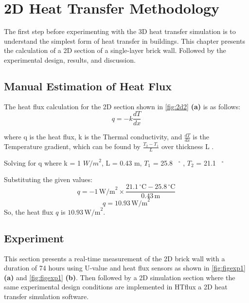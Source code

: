 
\chapter{2D Heat Transfer Methodology}
The first step before experimenting with the 3D heat transfer simulation is to understand the simplest form of heat transfer in buildings. This chapter presents the calculation of a 2D section of a single-layer brick wall. Followed by the experimental design, results, and discussion.

\section{Manual Estimation of Heat Flux}
The heat flux calculation for the 2D section shown in \ref{fig:2d2} \textbf{(a)} is as follows:
\begin{equation}
q = -k \frac{dT}{dx}
\end{equation}

where q is the heat flux,
k is the Thermal conductivity, and
$\frac{dT}{dx}$ is the Temperature gradient, which can be found by $\frac{T_2 - T_1}{L}$ over thickness L \cite{heattransfund}. 

Solving for q where k = 1 ${W/m}^2$, 
L = 0.43 m,
$T_1$ = 25.8 \, $^\circ$ , 
$T_2$  = 21.1 \, $^\circ$ 



Substituting the given values:
\[ q = -1 \, \text{W/m}^2 \times \frac{21.1 \, ^\circ \text{C} - 25.8 \, ^\circ \text{C}}{0.43 \, \text{m}} \]
\[ q = 10.93 \, \text{W/m}^2 \]
So, the heat flux \( q \) is \( 10.93 \, \text{W/m}^2 \).





\section{Experiment}


This section presents a real-time measurement of the 2D brick wall with a duration of 74 hours using U-value and heat flux sensors as shown in \ref{fig:figexp1} \textbf{(a)} and \ref{fig:figexp1} \textbf{(b)}. Then followed by a 2D simulation section where the same experimental design conditions are implemented in HTflux \cite{HTflux} a 2D heat transfer simulation software.

